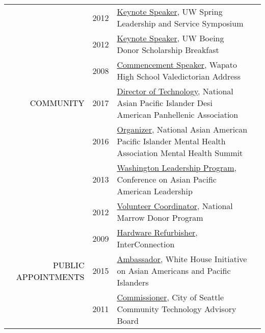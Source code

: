 \documentclass[12pt]{article}
\begin{document}
{{\begin{longtable}{Rp{1.0in}p{0.25in}p{4.75in}}
& \footnotesize{2012} & \href{https://youtu.be/WMPhe6H7yiM}{{Keynote Speaker}}, UW Spring Leadership and Service Symposium \\

& \footnotesize{2012} & \href{https://web.archive.org/web/20170801205151/https://ischool.uw.edu/news/2012/04/bryan-dosono-informatics-student-speaks-boeing-scholarship-breakfast}{{Keynote Speaker}}, UW Boeing Donor Scholarship Breakfast \\

& \footnotesize{2008} & \href{https://youtu.be/5gt7nFRgkac}{{Commencement Speaker}}, Wapato High School Valedictorian Address \\

\textcolor{black}{\footnotesize{\uppercase{Community}}} & \footnotesize{2017} & \href{http://napahq.org}{{Director of Technology}}, National Asian Pacific Islander Desi American Panhellenic Association \\

& \footnotesize{2016} & \href{https://www.facebook.com/events/215634702135825/}{{Organizer}}, National Asian American Pacific Islander Mental Health Association Mental Health Summit \\

& \footnotesize{2013} & \href{http://www.capal.org/programs/wlp/}{{Washington Leadership Program}}, Conference on Asian Pacific American Leadership \\

& \footnotesize{2012} & \href{http://www.dailyuw.com/news/article_de3524ce-3d5e-5dd2-8de7-5deebee463d9.html}{{Volunteer Coordinator}}, National Marrow Donor Program \\

& \footnotesize{2009} & \href{http://www.washington.edu/news/2010/04/22/student-service-and-leadership-to-be-celebrated-april-28/}{{Hardware Refurbisher}}, InterConnection \\

\textcolor{black}{\footnotesize{\uppercase{Public Appointments}}} & \footnotesize{2015} & \href{http://sites.ed.gov/aapi/e3-ambassadors/}{{Ambassador}}, White House Initiative on Asian Americans and Pacific Islanders \\

& \footnotesize{2011} & \href{https://web.archive.org/web/20150911093548/https://ischool.uw.edu/alumni/impact-stories/informatics-grad-and-husky-promise-student-aims-deliver-it-resources}{{Commissioner}}, City of Seattle Community Technology Advisory Board \\


\end{longtable}}}
\end{document}
